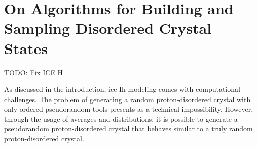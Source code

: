 \chapter{On Algorithms for Building and Sampling Disordered Crystal States}
\label{ch:ice XI}

TODO: Fix ICE H

As discussed in the introduction, ice Ih modeling comes with computational challenges. The problem of ge n e r a t i n g   a   r a n d o m   p r o t o n - d i s o r d e r e d   c r y s t a l   w i t h   o n l y   o r d e r e d   p s e u d o r a n d o m   t o o l s   p r e s e n t s   a s   a   t e c h n i c a l   i m p o s s i b i l i t y .   H o w e v e r ,   t h r o u g h   t h e   u s a g e   o f   a v e r a g e s   a n d   d i s t r i b u t i o n s ,   i t   i s   p o s s i b l e   t o   g e n e r a t e   a   p s e u d o r a n d o m   p r o t o n - d i s o r d e r e d   c r y s t a l   t h a t   b e h a v e s   s i m i l a r   t o   a   t r u l y   r a n d o m   p r o t o n - d i s o r d e r e d   c r y s t a l .

